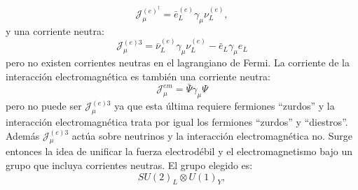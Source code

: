 \documentclass{article}
\theoremstyle{plain}
\theoremstyle{definition}
\begin{document}
	\[
	\mathcal{J}_\mu^{(e)^\dagger} =\bar{e}_L^{(e)}\gamma_{\mu} \nu^{(e)}_L,
	\]
	y una corriente neutra: 
	\[\mathcal{J}_\mu^{(e)3}= \bar{\nu}_L^{(e)}\gamma_{\mu}\nu_L^{(e)}-\bar{e}_L\gamma_{\mu}e_L \] pero no existen corrientes neutras en el lagrangiano de Fermi. La corriente de la interacción electromagnética es también una corriente neutra: 
	\[
	\mathcal{J}_\mu^{em} =\bar{\Psi}\gamma_{\mu}\Psi
	\] pero no puede ser \(\mathcal{J}_\mu^{(e)3}\) ya que esta última requiere fermiones ``zurdos'' y la interacción electromagnética trata por igual los fermiones ``zurdos'' y  ``diestros''. Además \(\mathcal{J}_\mu^{(e)3}\) actúa sobre neutrinos y la interacción electromagnética no. Surge entonces la idea de unificar la fuerza electrodébil y el electromagnetismo bajo un grupo que incluya corrientes neutras. El grupo elegido es: 
	\[
	SU(2)_L\otimes U(1)_Y,
	\]
	
\end{document}
